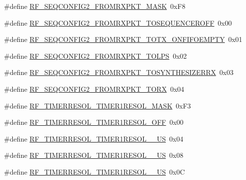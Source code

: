 \begin{DoxyCompactItemize}
\item 
\#define \mbox{\hyperlink{sx1276_regs-_fsk_8h_af969ae590556e2c15a447e7fc528bd41}{R\+F\+\_\+\+S\+E\+Q\+C\+O\+N\+F\+I\+G2\+\_\+\+F\+R\+O\+M\+R\+X\+P\+K\+T\+\_\+\+M\+A\+SK}}~0x\+F8
\item 
\#define \mbox{\hyperlink{sx1276_regs-_fsk_8h_a6540dab5dd5ba1667a344a2c1f40a16e}{R\+F\+\_\+\+S\+E\+Q\+C\+O\+N\+F\+I\+G2\+\_\+\+F\+R\+O\+M\+R\+X\+P\+K\+T\+\_\+\+T\+O\+S\+E\+Q\+U\+E\+N\+C\+E\+R\+O\+FF}}~0x00
\item 
\#define \mbox{\hyperlink{sx1276_regs-_fsk_8h_a967bc541983c4f4ffd13d25eb67a751f}{R\+F\+\_\+\+S\+E\+Q\+C\+O\+N\+F\+I\+G2\+\_\+\+F\+R\+O\+M\+R\+X\+P\+K\+T\+\_\+\+T\+O\+T\+X\+\_\+\+O\+N\+F\+I\+F\+O\+E\+M\+P\+TY}}~0x01
\item 
\#define \mbox{\hyperlink{sx1276_regs-_fsk_8h_aa27b9d5f133d0c76752de6696f68de93}{R\+F\+\_\+\+S\+E\+Q\+C\+O\+N\+F\+I\+G2\+\_\+\+F\+R\+O\+M\+R\+X\+P\+K\+T\+\_\+\+T\+O\+L\+PS}}~0x02
\item 
\#define \mbox{\hyperlink{sx1276_regs-_fsk_8h_a23dbeccd9f9305bc5e606ad683a2e26c}{R\+F\+\_\+\+S\+E\+Q\+C\+O\+N\+F\+I\+G2\+\_\+\+F\+R\+O\+M\+R\+X\+P\+K\+T\+\_\+\+T\+O\+S\+Y\+N\+T\+H\+E\+S\+I\+Z\+E\+R\+RX}}~0x03
\item 
\#define \mbox{\hyperlink{sx1276_regs-_fsk_8h_a3d05f39e4ba0e2326381877cde06c05d}{R\+F\+\_\+\+S\+E\+Q\+C\+O\+N\+F\+I\+G2\+\_\+\+F\+R\+O\+M\+R\+X\+P\+K\+T\+\_\+\+T\+O\+RX}}~0x04
\item 
\#define \mbox{\hyperlink{sx1276_regs-_fsk_8h_afefc0f259bc8bcdde6d343b3dc397499}{R\+F\+\_\+\+T\+I\+M\+E\+R\+R\+E\+S\+O\+L\+\_\+\+T\+I\+M\+E\+R1\+R\+E\+S\+O\+L\+\_\+\+M\+A\+SK}}~0x\+F3
\item 
\#define \mbox{\hyperlink{sx1276_regs-_fsk_8h_a06e61a3885ef4ec1cdf878d7f733185d}{R\+F\+\_\+\+T\+I\+M\+E\+R\+R\+E\+S\+O\+L\+\_\+\+T\+I\+M\+E\+R1\+R\+E\+S\+O\+L\+\_\+\+O\+FF}}~0x00
\item 
\#define \mbox{\hyperlink{sx1276_regs-_fsk_8h_a96cf4090d4f2c3bad6d3700db6bd46d5}{R\+F\+\_\+\+T\+I\+M\+E\+R\+R\+E\+S\+O\+L\+\_\+\+T\+I\+M\+E\+R1\+R\+E\+S\+O\+L\+\_\+\_\+\+US}}~0x04
\item 
\#define \mbox{\hyperlink{sx1276_regs-_fsk_8h_a487b01361759b258d03235fcff6d5d51}{R\+F\+\_\+\+T\+I\+M\+E\+R\+R\+E\+S\+O\+L\+\_\+\+T\+I\+M\+E\+R1\+R\+E\+S\+O\+L\+\_\+\_\+\+US}}~0x08
\item 
\#define \mbox{\hyperlink{sx1276_regs-_fsk_8h_ac742a40587f098201b3fb024c6b24020}{R\+F\+\_\+\+T\+I\+M\+E\+R\+R\+E\+S\+O\+L\+\_\+\+T\+I\+M\+E\+R1\+R\+E\+S\+O\+L\+\_\+\_\+\+US}}~0x0C

\end{DoxyCompactItemize}
